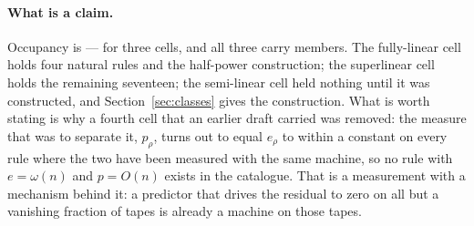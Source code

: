 \documentclass[11pt]{article}
\theoremstyle{remark}
\begin{document}
\paragraph{What is a claim.} Occupancy is --- for three cells, and all three carry members. The
fully-linear cell holds four natural rules and the half-power construction; the superlinear cell
holds the remaining seventeen; the semi-linear cell held nothing until it was constructed, and
Section~\ref{sec:classes} gives the construction. What is worth stating is why a fourth cell that an
earlier draft carried was removed: the measure that was to separate it, $p_{\rho}$, turns out to equal
$e_{\rho}$ to within a constant on every rule where the two have been measured with the same
machine, so no rule with $e=\omega(n)$ and $p=O(n)$ exists in the catalogue. That is a measurement
with a mechanism behind it: a predictor that drives the residual to zero on all but a vanishing
fraction of tapes is already a machine on those tapes.
\end{document}
